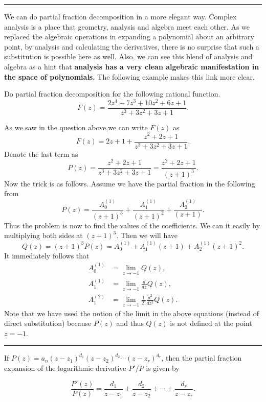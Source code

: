 \hrule

\begin{fact}
	We can do partial fraction decomposition in a more elegant way. Complex analysis is a place that geometry, analysis and algebra meet each other. As we replaced the algebraic operations in expanding a polynomial about an arbitrary point, by analysis and calculating the derivatives, there is no surprise that such a substitution is possible here as well. Also, we can see this blend of analysis and algebra as a hint that\textbf{ analysis has a very clean algebraic manifestation in the space of polynomials.  } The following example makes this link more clear. 
\end{fact}

\begin{exm}
	Do partial fraction decomposition for the following rational function.
	\[ F(z) = \frac{2z^4+7z^3+10z^2+6z+1}{z^3+3z^2+3z+1}. \]
\end{exm}

\begin{answer}
	As we saw in the question above,we can write  $F(z)$ as 
	\[ F(z) = 2z + 1 + \frac{z^2 + 2z + 1}{z^3+3z^2+3z+1}. \] 
	Denote the last term as
	\[ P(z) = \frac{z^2 + 2z + 1}{z^3+3z^2+3z+1} = \frac{z^2 + 2z + 1}{(z+1)^3}. \]
	Now the trick is as follows. Assume we have the partial fraction in the following from
	\[ P(z)  = \frac{A_0^{(1)}}{(z+1)^3} + \frac{A_1^{(1)}}{(z+1)^2} + \frac{A_2^{(1)}}{(z+1)}. \]
	Thus the problem is now to find the values of the coefficients. We can it easily by multiplying both sides at $(z+1)^3$. Then we will have
	\[ Q(z) = (z+1)^3 P(z) = A_0^{(1)} + A_1^{(1)} (z+1) + A_2^{(1)}(z+1)^2 .\]
	It immediately follows that 
	\begin{align*}
		A_0^{(1)} &= \lim_{z\to-1} Q(z), \\
		A_1^{(1)} &= \lim_{z\to-1} \frac{d}{dz} Q(z), \\
		A_1^{(2)} &= \lim_{z\to-1} \frac{1}{2!} \frac{d^2}{dz^2} Q(z).
	\end{align*}
	Note that we have used the notion of the limit in the above equations (instead of direct substitution) because $P(z)$ and thus $Q(z)$ is not defined at the point $z = -1$.
\end{answer}


\hrule 

\begin{fact}
	If $P(z) = a_n (z-z_1)^{d_1} (z-z_2)^{d_2} \cdots (z-z_r)^{d_r}$, then the partial fraction expansion of the logarithmic derivative $P'/P$ is given by
	
	\[ \frac{P'(z)}{P(z)} = \frac{d_1}{z-z_1} + \frac{d_2}{z-z_2} + \cdots + \frac{d_r}{z-z_r}. \]
\end{fact}

